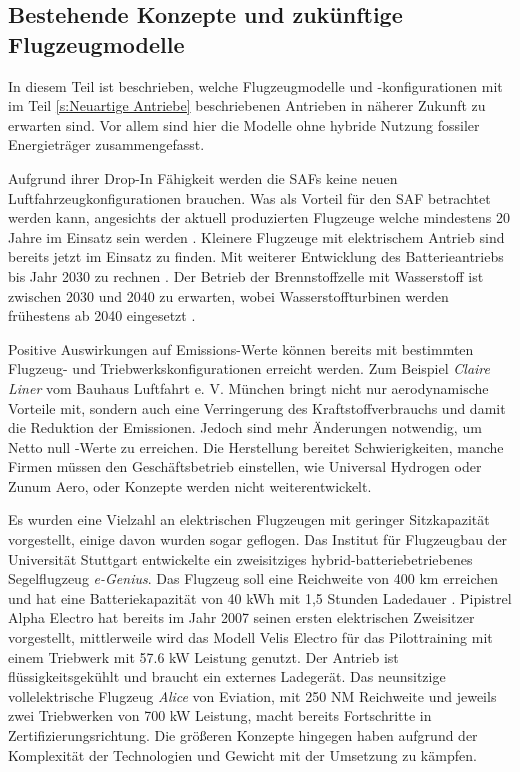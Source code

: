 \subsection{Bestehende Konzepte und zukünftige Flugzeugmodelle}
In diesem Teil ist beschrieben, welche Flugzeugmodelle und -konfigurationen 
mit im Teil \ref{s:Neuartige Antriebe} beschriebenen Antrieben in näherer Zukunft zu erwarten sind. 
Vor allem sind hier die Modelle ohne hybride Nutzung fossiler Energieträger zusammengefasst.

Aufgrund ihrer Drop-In Fähigkeit werden die SAFs keine neuen Luftfahrzeugkonfigurationen brauchen. 
Was als Vorteil für den SAF betrachtet werden kann, 
angesichts der aktuell produzierten Flugzeuge welche
mindestens 20 Jahre im Einsatz sein werden \cite{austr}.  
Kleinere Flugzeuge mit elektrischem Antrieb sind bereits jetzt im Einsatz zu finden. 
Mit weiterer Entwicklung des Batterieantriebs bis Jahr 2030 zu rechnen \cite{austr}.  %
Der Betrieb der Brennstoffzelle mit Wasserstoff ist zwischen 2030 und 2040 zu erwarten, 
wobei Wasserstoffturbinen werden frühestens ab 2040 eingesetzt \cite{austr}. 

%
Positive Auswirkungen auf Emissions-Werte können bereits mit bestimmten 
Flugzeug- und Triebwerkskonfigurationen erreicht werden.
Zum Beispiel \textit{Claire Liner} vom Bauhaus Luftfahrt e. V. München 
bringt nicht nur aerodynamische Vorteile mit, sondern auch eine Verringerung 
des Kraftstoffverbrauchs und damit die Reduktion der Emissionen.
Jedoch sind mehr Änderungen notwendig, um Netto null -Werte zu erreichen.
Die Herstellung bereitet Schwierigkeiten, manche Firmen müssen den Geschäftsbetrieb einstellen, 
wie Universal Hydrogen oder Zunum Aero, oder Konzepte werden nicht weiterentwickelt.

Es wurden eine Vielzahl an elektrischen Flugzeugen mit geringer 
Sitzkapazität vorgestellt, einige davon wurden sogar geflogen.
Das Institut für Flugzeugbau der Universität Stuttgart entwickelte 
ein zweisitziges hybrid-batteriebetriebenes Segelflugzeug \textit{e-Genius}. 
Das Flugzeug soll eine Reichweite von 400 km erreichen und hat eine 
Batteriekapazität von 40 kWh mit 1,5 Stunden Ladedauer \cite{IFB_eGenius_2025}.
Pipistrel Alpha Electro hat bereits im Jahr 2007 seinen ersten elektrischen Zweisitzer vorgestellt, 
mittlerweile wird das Modell \glqq Velis Electro\grqq{} \cite{Pipistrel_VelisElectro} für 
das Pilottraining mit einem Triebwerk mit 57.6 kW Leistung genutzt. 
Der Antrieb ist flüssigkeitsgekühlt und braucht ein externes Ladegerät. 
Das neunsitzige vollelektrische Flugzeug \textit{Alice} von Eviation, 
mit 250 NM Reichweite und jeweils zwei Triebwerken von 700 kW Leistung,
macht bereits Fortschritte in Zertifizierungsrichtung.
%
Die größeren Konzepte hingegen haben aufgrund der Komplexität der Technologien 
und Gewicht mit der Umsetzung zu kämpfen.\\


